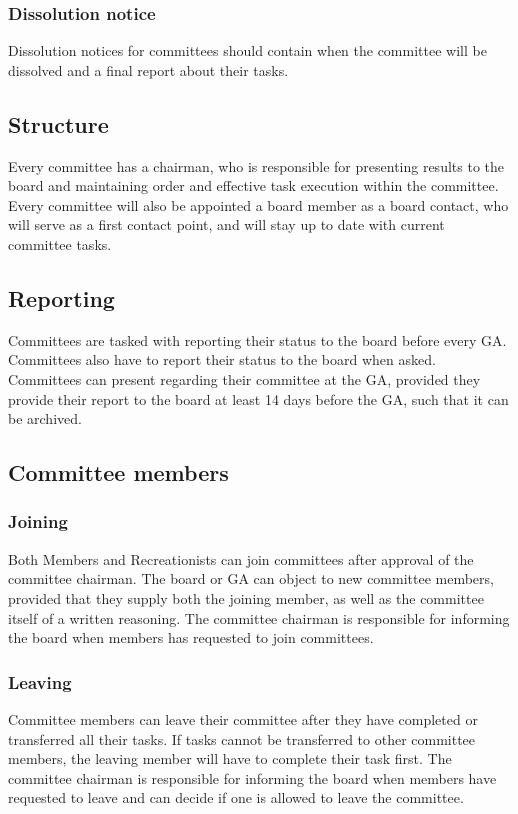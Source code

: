 \documentclass[a4paper]{article}
\begin{document}
\subsubsection{Dissolution notice}
Dissolution notices for committees should contain when the committee will be dissolved and a final report about their tasks.

\subsection{Structure}
Every committee has a chairman, who is responsible for presenting results to the board and maintaining order and effective task execution within the committee. Every committee will also be appointed a board member as a board contact, who will serve as a first contact point, and will stay up to date with current committee tasks.

\subsection{Reporting}
Committees are tasked with reporting their status to the board before every GA. Committees also have to report their status to the board when asked. Committees can present regarding their committee at the GA, provided they provide their report to the board at least 14 days before the GA, such that it can be archived.

\subsection{Committee members}
\subsubsection{Joining}
Both Members and Recreationists can join committees after approval of the committee chairman. The board or GA can object to new committee members, provided that they supply both the joining member, as well as the committee itself of a written reasoning. The committee chairman is responsible for informing the board when members has requested to join committees.

\subsubsection{Leaving}
Committee members can leave their committee after they have completed or transferred all their tasks. If tasks cannot be transferred to other committee members, the leaving member will have to complete their task first. The committee chairman is responsible for informing the board when members have requested to leave and can decide if one is allowed to leave the committee. \\ 
\end{document}
